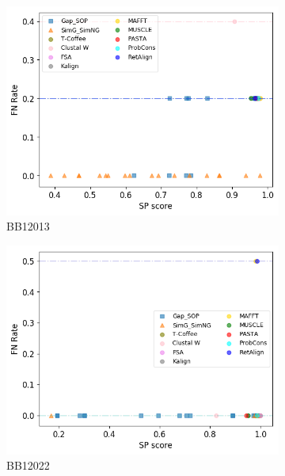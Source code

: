 \begin{figure}[!htbp]
\begin{adjustwidth}{-1cm}{-1cm}
\begin{subfigure}{0.22\textwidth}
			\includegraphics[width=\columnwidth]{Figure/summary/precomputedInit/Balibase/BB12013_fnrate_vs_sp_2}
			\caption{BB12013}
		\end{subfigure}
		\begin{subfigure}{0.22\textwidth}
			\includegraphics[width=\columnwidth]{Figure/summary/precomputedInit/Balibase/BB12022_fnrate_vs_sp_2}
			\caption{BB12022}
		\end{subfigure}
		\begin{subfigure}{0.22\textwidth}

\end{subfigure}
\end{adjustwidth}
\end{figure}
